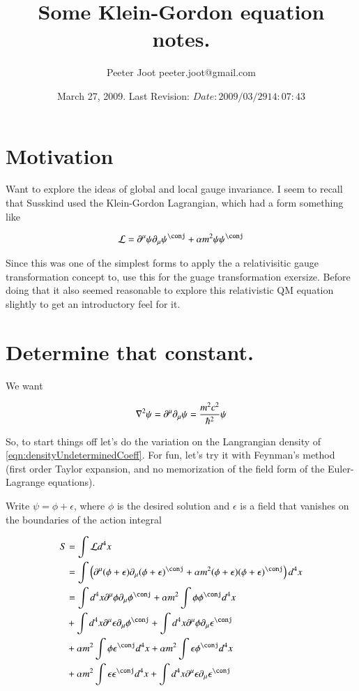 \documentclass{article}
\title{ Some Klein-Gordon equation notes. }
\author{Peeter Joot \quad peeter.joot@gmail.com }
\date{ March 27, 2009.  Last Revision: $Date: 2009/03/29 14:07:43 $ }
\begin{document}
\maketitle{}
\tableofcontents
\section{ Motivation }

Want to explore the ideas of global and local gauge invariance.  I seem to recall that Susskind
used the Klein-Gordon Lagrangian, which had a form something like

\begin{align}\label{eqn:densityUndeterminedCoeff}
\LL = \partial^\mu \psi \partial_\mu \psi^\conj + \alpha m^2 \psi \psi^\conj
\end{align}

Since this was one of the simplest forms to apply the 
a relativisitic gauge transformation concept to, use this for the guage transformation exersize.  Before doing that it also seemed reasonable to
explore this relativistic QM equation slightly to get an introductory feel for it.

\section{ Determine that constant. }

We want

\begin{align*}
\nabla^2 \psi = \partial^\mu \partial_\mu \psi = \frac{m^2 c^2}{\hbar^2} \psi
\end{align*}

So, to start things off let's do the variation on the Langrangian density of \ref{eqn:densityUndeterminedCoeff}.  For fun, let's try it with Feynman's method (first order Taylor expansion, and no memorization
of the field form of the Euler-Lagrange equations).

Write $\psi = \phi + \epsilon$, where $\phi$ is the desired solution and $\epsilon$ is a field that
vanishes on the boundaries of the action integral

\begin{align*}
S 
&= \int \LL d^4 x \\
&= 
\int \left( \partial^\mu (\phi + \epsilon) \partial_\mu (\phi + \epsilon)^\conj + \alpha m^2 (\phi + \epsilon) (\phi + \epsilon)^\conj \right) d^4 x \\
&= 
\int d^4 x \partial^\mu \phi \partial_\mu \phi^\conj 
+ \alpha m^2 \int \phi \phi^\conj  d^4 x \\
&+ \int d^4 x \partial^\mu \epsilon \partial_\mu \phi^\conj 
+ \int d^4 x \partial^\mu \phi \partial_\mu \epsilon^\conj  \\
&+ \alpha m^2 \int \phi \epsilon^\conj  d^4 x
+ \alpha m^2 \int \epsilon \phi^\conj  d^4 x \\
&+ \alpha m^2 \int \epsilon \epsilon^\conj  d^4 x
+ \int d^4 x \partial^\mu \epsilon \partial_\mu \epsilon^\conj \\
\end{align*}
\end{document}

